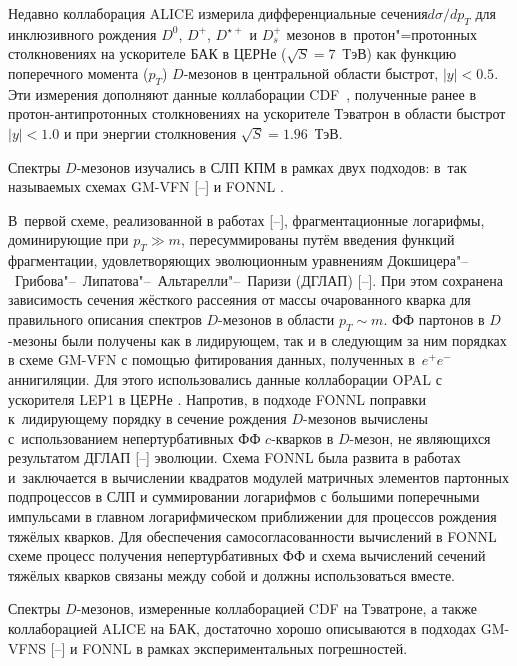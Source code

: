 Недавно коллаборация ALICE измерила дифференциальные сечения\linebreak $d\sigma /dp_T$ для инклюзивного рождения $D^{0}$, $D^{+}$, $D^{\star+}$ и $D_{s}^{+}$ мезонов \cite{ALICE7,ALICE7Ds} в~протон"=протонных столкновениях на ускорителе БАК в ЦЕРНе ($\sqrt{S}=7$~ТэВ) как функцию поперечного момента ($p_T$) $D$-мезонов в центральной области быстрот, $|y|<0.5$. Эти измерения дополняют данные коллаборации CDF~\cite{CDFdmeson}, полученные ранее в протон-антипротонных столкновениях на ускорителе Тэватрон в области быстрот $|y|<1.0$ и при энергии столкновения ${\sqrt{S}=1.96}$~ТэВ.



Спектры $D$-мезонов изучались в СЛП КПМ в рамках двух подходов: в~так называемых схемах GM-VFN [--] и FONNL \cite{FONLL}. 

В~первой схеме, реализованной в работах [--], фрагментационные логарифмы, доминирующие при $p_T\gg m$, пересуммированы путём введения функций фрагментации, удовлетворяющих эволюционным уравнениям Докшицера"--~Грибова"--~Липатова"--~Альтарелли"--~Паризи (ДГЛАП) [--]. При этом сохранена зависимость сечения жёсткого рассеяния от массы очарованного кварка для правильного описания спектров $D$-мезонов в области $p_T\sim m$. ФФ партонов в $D$-мезоны были получены как в лидирующем, так и в следующим за ним порядках в схеме GM-VFN с помощью фитирования данных, полученных в~${e^+e^-}$ аннигиляции. Для этого использовались данные коллаборации OPAL с ускорителя LEP1 в ЦЕРНе \cite{LEP10,LEP11}. Напротив, в подходе FONNL поправки к~лидирующему порядку в сечение рождения $D$-мезонов вычислены с~использованием непертурбативных ФФ $c$-кварков в $D$-мезон, не являющихся результатом ДГЛАП [--] эволюции. Схема FONNL была развита в работах \cite{Nason,newNLO} и~заключается в вычислении квадратов модулей матричных элементов партонных подпроцессов в СЛП и суммировании логарифмов с большими поперечными импульсами в главном логарифмическом приближении для  процессов рождения тяжёлых кварков. Для обеспечения самосогласованности вычислений в FONNL схеме \cite{Nason,newNLO} процесс получения непертурбативных ФФ и схема вычислений сечений тяжёлых кварков связаны между собой и должны использоваться вместе.

Спектры $D$-мезонов, измеренные коллаборацией CDF \cite{CDFdmeson} на Тэватроне, а также коллаборацией ALICE \cite{ALICE7,ALICE7Ds} на БАК, достаточно хорошо описываются в подходах GM-VFNS [--] и FONNL \cite{Nason,newNLO} в рамках экспериментальных погрешностей.



